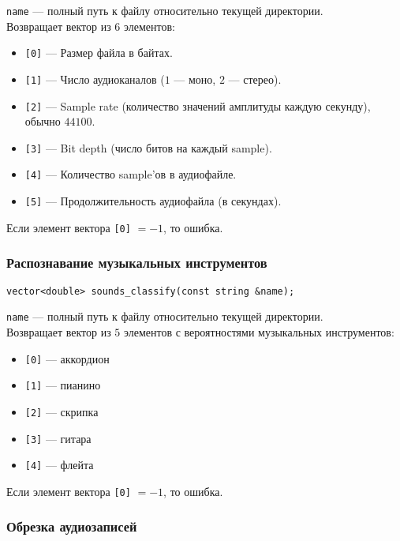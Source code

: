 \documentclass[14pt,a4paper]{article}
\begin{document}
\lstinline{name} --- полный путь к файлу относительно текущей директории. \\

\noindent Возвращает вектор из $6$ элементов:
\smallskip 
\begin{itemize}
\item[] \lstinline{[0]} --- Размер файла в байтах.
\item[] \lstinline{[1]} --- Число аудиоканалов ($1$ --- моно, $2$ --- стерео).
\item[] \lstinline{[2]} --- Sample rate (количество значений амплитуды каждую секунду), обычно $44100$.
\item[] \lstinline{[3]} --- Bit depth (число битов на каждый sample).
\item[] \lstinline{[4]} --- Количество sample'ов в аудиофайле.
\item[] \lstinline{[5]} --- Продолжительность аудиофайла (в секундах).
\end{itemize}

\noindent Если элемент вектора \lstinline{[0]} $= -1$, то ошибка.

\subsubsection*{Распознавание музыкальных инструментов}

\begin{lstlisting}
vector<double> sounds_classify(const string &name);
\end{lstlisting}

\lstinline{name} --- полный путь к файлу относительно текущей директории. \\

\noindent Возвращает вектор из $5$ элементов с вероятностями музыкальных инструментов:
\smallskip 
\begin{itemize}
\item[] \lstinline{[0]} --- аккордион
\item[] \lstinline{[1]} --- пианино
\item[] \lstinline{[2]} --- скрипка
\item[] \lstinline{[3]} --- гитара
\item[] \lstinline{[4]} --- флейта
\end{itemize}

\noindent Если элемент вектора \lstinline{[0]} $= -1$, то ошибка.

\subsubsection*{Обрезка аудиозаписей}
\end{document}
